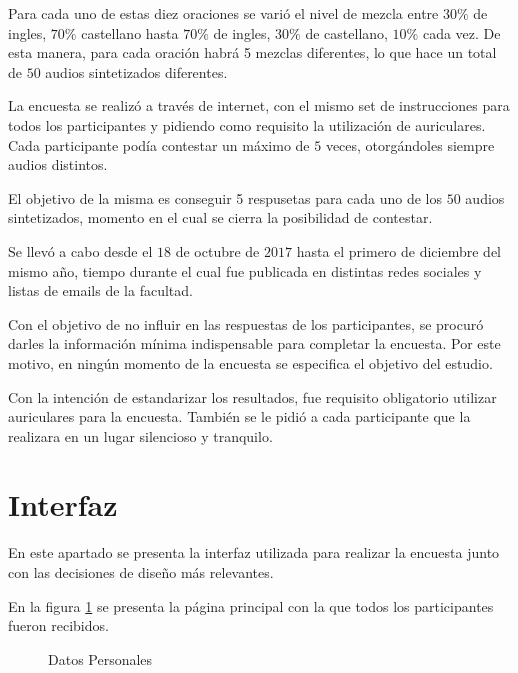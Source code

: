 Para cada uno de estas diez oraciones se varió el nivel de mezcla entre $30\%$ de ingles, $70\%$ castellano hasta $70\%$ de ingles, $30\%$ de castellano, $10\%$ cada vez. De esta manera, para cada oración habrá 5 mezclas diferentes, lo que hace un total de $50$ audios sintetizados diferentes.

La encuesta se realizó a través de internet, con el mismo set de instrucciones para todos los participantes y pidiendo como requisito la utilización de auriculares. Cada participante podía contestar un máximo de $5$ veces, otorgándoles siempre audios distintos.

El objetivo de la misma es conseguir 5 respusetas para cada uno de los $50$ audios sintetizados, momento en el cual se cierra la posibilidad de contestar.

Se llevó a cabo desde el $18$ de octubre de $2017$ hasta el primero de diciembre del mismo año, tiempo durante el cual fue publicada en distintas redes sociales y listas de emails de la facultad.

Con el objetivo de no influir en las respuestas de los participantes, se procuró darles la información mínima indispensable para completar la encuesta. Por este motivo, en ningún momento de la encuesta se especifica el objetivo del estudio.

Con la intención de estandarizar los resultados, fue requisito obligatorio utilizar auriculares para la encuesta. También se le pidió a cada participante que la realizara en un lugar silencioso y tranquilo.

\section{Interfaz}

En este apartado se presenta la interfaz utilizada para realizar la encuesta junto con las decisiones de diseño más relevantes. 

En la figura \ref{personalData} se presenta la página principal con la que todos los participantes fueron recibidos.

\begin{figure}[htp]
\begin{center}
\end{center}
\caption{Datos Personales}
\label{personalData}
\end{figure}


